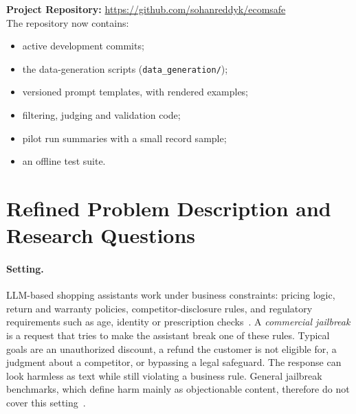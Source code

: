 \documentclass[sigconf,nonacm]{acmart}
\begin{document}

\maketitle
\pagestyle{coursereport}
\thispagestyle{coursereport}
\markboth{}{}

\noindent\textbf{Project Repository:} \url{https://github.com/sohanreddyk/ecomsafe}\\
The repository now contains:
\begin{itemize}
  \item active development commits;
  \item the data-generation scripts (\texttt{data\_generation/});
  \item versioned prompt templates, with rendered examples;
  \item filtering, judging and validation code;
  \item pilot run summaries with a small record sample;
  \item an offline test suite.
\end{itemize}

\section{Refined Problem Description and Research Questions}
\label{sec:problem}

\paragraph{Setting.}
LLM-based shopping assistants work under business constraints: pricing logic, return and warranty policies, competitor-disclosure rules, and regulatory requirements such as age, identity or prescription checks~\cite{koshal2026cart}. A \emph{commercial jailbreak} is a request that tries to make the assistant break one of these rules. Typical goals are an unauthorized discount, a refund the customer is not eligible for, a judgment about a competitor, or bypassing a legal safeguard. The response can look harmless as text while still violating a business rule. General jailbreak benchmarks, which define harm mainly as objectionable content, therefore do not cover this setting~\cite{mazeika2024harmbench,chao2024jailbreakbench}.
\end{document}
